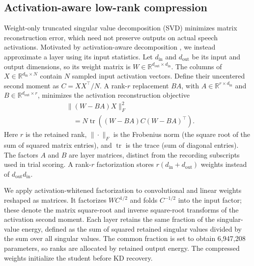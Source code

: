 \documentclass[11pt]{article}
\begin{document}
\subsection{Activation-aware low-rank compression}
Weight-only truncated singular value decomposition (SVD) minimizes matrix reconstruction error, which need not preserve outputs on actual speech activations. Motivated by activation-aware decomposition \citep{yuan2023asvd}, we instead approximate a layer using its input statistics. Let $d_{\mathrm{in}}$ and $d_{\mathrm{out}}$ be its input and output dimensions, so its weight matrix is $W\in\mathbb R^{d_{\mathrm{out}}\times d_{\mathrm{in}}}$. The columns of $X\in\mathbb R^{d_{\mathrm{in}}\times N}$ contain $N$ sampled input activation vectors. Define their uncentered second moment as $C=XX^\top/N$. A rank-$r$ replacement $BA$, with $A\in\mathbb R^{r\times d_{\mathrm{in}}}$ and $B\in\mathbb R^{d_{\mathrm{out}}\times r}$, minimizes the activation reconstruction objective
\begin{equation}
 \begin{aligned}
 &\|(W-BA)X\|_F^2 \\
 &\quad=N\operatorname{tr}((W-BA)C(W-BA)^\top).
 \end{aligned}
\end{equation}
Here $r$ is the retained rank, $\|\cdot\|_F$ is the Frobenius norm (the square root of the sum of squared matrix entries), and $\operatorname{tr}$ is the trace (sum of diagonal entries). The factors $A$ and $B$ are layer matrices, distinct from the recording subscripts used in trial scoring. A rank-$r$ factorization stores $r(d_{\mathrm{in}}+d_{\mathrm{out}})$ weights instead of $d_{\mathrm{out}}d_{\mathrm{in}}$.

We apply activation-whitened factorization to convolutional and linear weights reshaped as matrices. It factorizes $WC^{1/2}$ and folds $C^{-1/2}$ into the input factor; these denote the matrix square-root and inverse square-root transforms of the activation second moment. Each layer retains the same fraction of the singular-value energy, defined as the sum of squared retained singular values divided by the sum over all singular values. The common fraction is set to obtain 6,947,208 parameters, so ranks are allocated by retained output energy. The compressed weights initialize the student before KD recovery.
\end{document}
